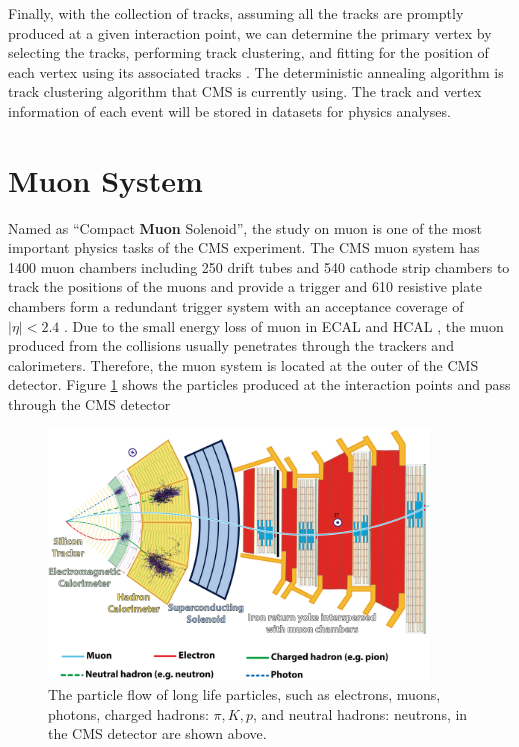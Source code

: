 Finally, with the collection of tracks, assuming all the tracks are promptly produced at a given interaction point, we can determine the primary vertex by selecting the tracks, performing track clustering, and fitting for the position of each vertex using its associated tracks \cite{CMSTrackComp}. The deterministic annealing algorithm \cite{DAAlgo} is track clustering algorithm that CMS is currently using. The track and vertex information of each event will be stored in datasets for physics analyses.

\section{Muon System}

Named as ``Compact \textbf{Muon} Solenoid'', the study on muon is one of the most important physics tasks of the CMS experiment. The CMS muon system has 1400 muon chambers including 250 drift tubes and 540 cathode strip chambers to track the positions of the muons and provide a trigger and 610 resistive plate chambers form a redundant trigger system with an acceptance coverage of $|\eta| < 2.4$ . Due to the small energy loss of muon in ECAL and HCAL \cite{AlphaTheoEx}, the muon produced from the collisions usually penetrates through the trackers and calorimeters. Therefore, the muon system is located at the outer of the CMS detector. Figure \ref{ParticleFlow} shows the particles produced at the interaction points and pass through the CMS detector

\begin{figure}[hbtp]
\begin{center}
\includegraphics[width=0.90\textwidth]{Figures/Chapter2/CMSParticleFlow.png}
\caption{The particle flow of long life particles, such as electrons, muons, photons, charged hadrons: $\pi,K,p$, and neutral hadrons: neutrons, in the CMS detector are shown above.}
\label{ParticleFlow}
\end{center}
\end{figure} 

